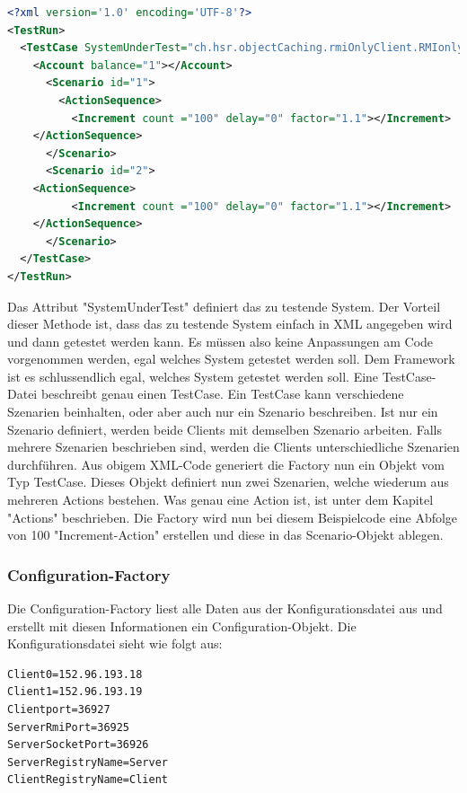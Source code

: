 \begin{lstlisting}[language=XML, breaklines=true] 	
<?xml version='1.0' encoding='UTF-8'?>
<TestRun>
  <TestCase SystemUnderTest="ch.hsr.objectCaching.rmiOnlyClient.RMIonlyClientSystem">
    <Account balance="1"></Account>
      <Scenario id="1">
        <ActionSequence>
          <Increment count ="100" delay="0" factor="1.1"></Increment>
	</ActionSequence>
      </Scenario>
      <Scenario id="2">
	<ActionSequence>
          <Increment count ="100" delay="0" factor="1.1"></Increment>
	</ActionSequence>
      </Scenario>
  </TestCase>
</TestRun>
\end{lstlisting}

Das Attribut "SystemUnderTest" definiert das zu testende System. Der Vorteil dieser Methode ist, dass das zu testende System einfach in XML angegeben wird und dann getestet werden kann. Es müssen also keine Anpassungen am Code vorgenommen werden, egal welches System getestet werden soll. Dem Framework ist es schlussendlich egal, welches System getestet werden soll.\newline
Eine TestCase-Datei beschreibt genau einen TestCase. Ein TestCase kann verschiedene Szenarien beinhalten, oder aber auch nur ein Szenario beschreiben. Ist nur ein Szenario definiert, werden beide Clients mit demselben Szenario arbeiten. Falls mehrere Szenarien beschrieben sind, werden die Clients unterschiedliche Szenarien durchführen. \newline
Aus obigem XML-Code generiert die Factory nun ein Objekt vom Typ TestCase. Dieses Objekt definiert nun zwei Szenarien, welche wiederum aus mehreren Actions bestehen. Was genau eine Action ist, ist unter dem Kapitel "Actions" beschrieben. Die Factory wird nun bei diesem Beispielcode eine Abfolge von 100 "Increment-Action" erstellen und diese in das Scenario-Objekt ablegen.


\subsubsection{Configuration-Factory}
\label{sec:configurationFactory}
Die Configuration-Factory liest alle Daten aus der Konfigurationsdatei aus und erstellt mit diesen Informationen ein Configuration-Objekt. Die Konfigurationsdatei sieht wie folgt aus:
\begin{lstlisting}
Client0=152.96.193.18
Client1=152.96.193.19
Clientport=36927
ServerRmiPort=36925
ServerSocketPort=36926
ServerRegistryName=Server
ClientRegistryName=Client
\end{lstlisting}

